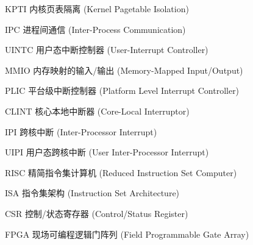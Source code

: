 
\begin{denotation}[3cm]
  \item[KPTI] {内核页表隔离 (Kernel Pagetable Isolation)}
  \item[IPC] {进程间通信 (Inter-Process Communication)}
  \item[UINTC] {用户态中断控制器 (User-Interrupt Controller)}
  \item[MMIO] {内存映射的输入/输出 (Memory-Mapped Input/Output)}  
  \item[PLIC] {平台级中断控制器 (Platform Level Interrupt Controller)}
  \item[CLINT] {核心本地中断器 (Core-Local Interruptor)}
  \item[IPI] {跨核中断 (Inter-Processor Interrupt)}
  \item[UIPI] {用户态跨核中断 (User Inter-Processor Interrupt)}
  \item[RISC] {精简指令集计算机 (Reduced Instruction Set Computer)}
  \item[ISA] {指令集架构 (Instruction Set Architecture)}
  \item[CSR] {控制/状态寄存器 (Control/Status Register)}
  \item[FPGA] {现场可编程逻辑门阵列 (Field Programmable Gate Array)}
\end{denotation}

